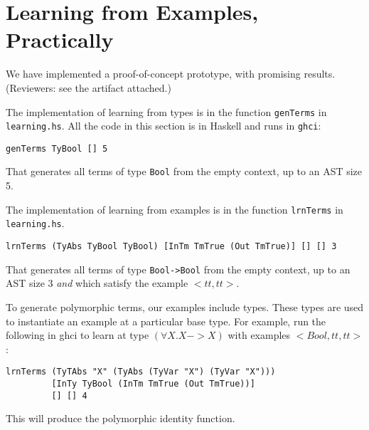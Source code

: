 \documentclass[acmsmall]{acmart}
\theoremstyle{mytheoremstyle}
\begin{document}
\section{Learning from Examples, Practically}


We have implemented a proof-of-concept prototype, with promising results.
(Reviewers: see the artifact attached.)



The implementation of learning from types is in the function {\tt genTerms} in {\tt learning.hs}. All the code in this section is in Haskell and runs in {\tt ghci}:
\begin{verbatim}
genTerms TyBool [] 5
\end{verbatim}

That generates all terms of type {\tt Bool} from the empty context, up to an AST size 5.

The implementation of learning from examples is in the function {\tt lrnTerms} in {\tt learning.hs}.
\begin{verbatim}
lrnTerms (TyAbs TyBool TyBool) [InTm TmTrue (Out TmTrue)] [] [] 3
\end{verbatim}

That generates all terms of type {\tt Bool->Bool} from the empty context, up to an AST size 3 \emph{and} which satisfy the example $<tt,tt>$. 

To generate polymorphic terms, our examples include types. These types are used to instantiate an example at a particular base type. For example, run the following in ghci to learn at type $(\forall X.X->X)$ with examples $<Bool,tt,tt>$:
\begin{verbatim}
lrnTerms (TyTAbs "X" (TyAbs (TyVar "X") (TyVar "X")))
         [InTy TyBool (InTm TmTrue (Out TmTrue))]
         [] [] 4
\end{verbatim}
This will produce the polymorphic identity function.
\end{document}
